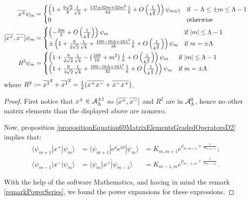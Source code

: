 \begin{proposition}
\begin{align}
    \cut{x^\pm}  \psi_m
        &= \begin{cases}
        \left(1 + \frac{9 \sqrt{2}}{8} \frac{1}{\sqrt{k}} + \frac{137 \pm 32m + 32m^2}{64} \frac{1}{k} + O\left(\frac{1}{k^{\frac{3}{2}}}\right) \right) \psi_{m \pm 1} & \text{if } -\Lambda \leq \pm m \leq \Lambda -1
        \\
        0 & \text{otherwise}
        \end{cases}\\
    [\cut{x^+}, \cut{x^-}]  \psi_m
        &= \begin{cases}
        \left( -\frac{2m}{k}  + O\left(\frac{1}{k^{\frac{3}{2}}}\right) \right) \psi_{m} & \text{if } |m| \leq \Lambda -1
        \\
        \pm \left( 1 + \frac{9}{2\sqrt{2}} \frac{1}{\sqrt{k}} +  \frac{109-16\Lambda + 16\lambda^2}{16} \frac{1}{k} + O\left(\frac{1}{k^{\frac{3}{2}}}\right) \right) \psi_{m} & \text{if } m = \pm \Lambda 
        \end{cases}\\
    R^2  \psi_m
        &= \begin{cases}
        \left( 1+ \frac{9}{2\sqrt{2}} \frac{1}{\sqrt{k}} -\left(\frac{109}{16}+m^2\right) \frac{1}{k}  + O\left(\frac{1}{k^{\frac{3}{2}}}\right) \right) \psi_{m} & \text{if } |m| \leq \Lambda -1
        \\
        \left( 1+ \frac{9}{4\sqrt{2}} \frac{1}{\sqrt{k}} + \frac{109-16\Lambda+16\lambda^2}{32} \frac{1}{k} + O\left(\frac{1}{k^{\frac{3}{2}}}\right) \right) \psi_{m} & \text{if } m = \pm \Lambda 
        \end{cases}
\end{align}
where $R^2 := \overline{x^1}^2 + \overline{x^1}^2 = \frac{1}{2}(\overline{x^+}\overline{x^-} + \overline{x^-}\overline{x^+})$.
\end{proposition}
\begin{proof}
First notice that $x^\pm \in \mathcal A^{\pm 1}_\Lambda$ so $[\overline{x^+}, \overline{x^-}]$ and $R^2$ are in $\mathcal A^0_\Lambda$, hence no other matrix elements than the displayed above are nonzero. 

Now, proposition \ref{propositionEquation69MatrixElementsGradedOperatorsD2} implies that:
\begin{align*}
    \langle \psi_{m+1} | x^+ | \psi_m \rangle 
        &= %
        \langle \psi_{m+1} | e^\rho e^{i\phi} | \psi_m \rangle
        &= %
        K_{m,m+1} e^{\rho_{m,m+1} + \frac{1}{4 c_{m,m+1}}};\\
    \langle \psi_{m-1} | x^- | \psi_m \rangle 
        &= \overline{\langle \psi_{m} | x^+ | \psi_{m-1} \rangle}
        &= K_{m-1,m} e^{\rho_{m-1,m} + \frac{1}{4 c_{m-1,m}}}.
\end{align*}

With the help of the software Mathematica, and having in mind the remark \ref{remarkPowerSeries}, we found the power expansions for these expressions.
\end{proof}

